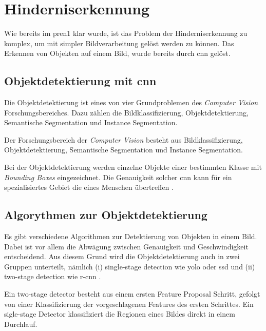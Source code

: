 \newpage

\section{Hinderniserkennung}

Wie bereits im \acrshort{pren1} klar wurde, ist das Problem der Hinderniserkennung zu komplex, um mit simpler Bildverarbeitung gelöst werden zu können. 
Das Erkennen von Objekten auf einem Bild, wurde bereits durch \acrfull{cnn} gelöst.

\subsection{Objektdetektierung mit \acrshort{cnn}}

Die Objektdetektierung ist eines von vier Grundproblemen des {\it Computer Vision} Forschungsbereiches.
Dazu zählen die Bildklassifizierung, Objektdetektierung, Semantische Segmentation und Instance Segmentation.

{
Der Forschungsbereich der {\it Computer Vision} \cite{wu2019recent} besteht aus Bildklassifizierung, 
Objektdetektierung, Semantische Segmentation und Instance Segmentation.
}

\newpage

Bei der Objektdetektierung werden einzelne Objekte einer bestimmten Klasse mit {\it Bounding Boxes}
eingezeichnet. Die Genauigkeit solcher \acrshort{cnn} kann für ein spezialisiertes Gebiet die
eines Menschen übertreffen \cite{BUETTIDINH2019e00321}.

\subsection{Algorythmen zur Objektdetektierung}

Es gibt verschiedene Algorithmen zur Detektierung von Objekten in einem Bild. 
Dabei ist vor allem die Abwägung zwischen Genauigkeit und Geschwindigkeit entscheidend.
Aus diesem Grund wird die Objektdetektierung auch in zwei Gruppen unterteilt, nämlich 
(i) single-stage detection wie \acrshort{yolo} \cite{redmon2016look} oder \acrshort{ssd} \cite{Liu_2016} und (ii) two-stage detection wie \acrfull{r-cnn} \cite{girshick2015fast}.

Ein two-stage detector besteht aus einem ersten Feature Proposal Schritt, gefolgt von einer Klassifizierung der vorgeschlagenen Features des ersten Schrittes. Ein sigle-stage Detector klassifiziert die Regionen eines Bildes direkt in einem Durchlauf. 


